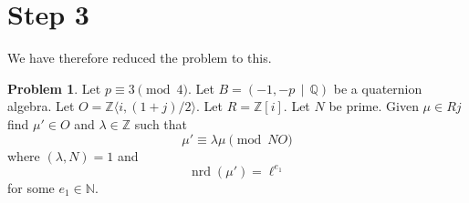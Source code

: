\documentclass[10pt]{article}
\theoremstyle{plain}
\theoremstyle{definition}
\newtheorem{prob}[theorem]{Problem}
\newcommand{\op}{\operatorname}
\newcommand{\N}{\mathbb{N}}
\newcommand{\Z}{\mathbb{Z}}
\newcommand{\Q}{\mathbb{Q}}
\newcommand{\nrd}{\op{nrd}}
\begin{document}
\section{Step 3}

We have therefore reduced the problem to this.
\begin{prob}
    Let \( p \equiv 3 \pmod{4} \).
    Let \( B =  (-1, -p \, \mid \, \Q) \) be a quaternion algebra.
    Let \( O = \Z \langle i, (1+j) / 2 \rangle \).
    Let \( R = \Z[i] \).
    Let \( N \) be prime.
    Given \( \mu \in Rj \) find \( \mu' \in O \) and \(\lambda \in \Z \) such that
    \[
        \mu' \equiv \lambda \mu \pmod{NO}
    \]
    where \( (\lambda, N) = 1 \) and
    \[
        \nrd(\mu') = \ell^{e_1}
    \]
    for some \( e_1 \in \N \).
\end{prob}
\end{document}
